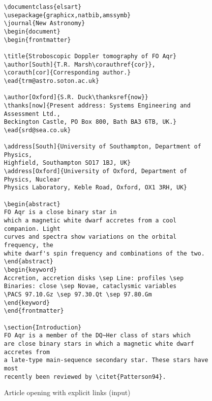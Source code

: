 \documentclass{elsart}
\begin{document}
\begin{figure}[p]

\caption{Article opening with explicit links (input)} \label{ex:explinput}
\vspace{1pc}

\begin{verbatim}
\documentclass{elsart}
\usepackage{graphicx,natbib,amssymb}
\journal{New Astronomy}
\begin{document}
\begin{frontmatter}

\title{Stroboscopic Doppler tomography of FO Aqr}
\author[South]{T.R. Marsh\corauthref{cor}},
\corauth[cor]{Corresponding author.}
\ead{trm@astro.soton.ac.uk}

\author[Oxford]{S.R. Duck\thanksref{now}}
\thanks[now]{Present address: Systems Engineering and Assessment Ltd.,
Beckington Castle, PO Box 800, Bath BA3 6TB, UK.}
\ead{srd@sea.co.uk}

\address[South]{University of Southampton, Department of Physics,
Highfield, Southampton SO17 1BJ, UK} 
\address[Oxford]{University of Oxford, Department of Physics, Nuclear
Physics Laboratory, Keble Road, Oxford, OX1 3RH, UK}
 
\begin{abstract} 
FO Aqr is a close binary star in
which a magnetic white dwarf accretes from a cool companion. Light
curves and spectra show variations on the orbital frequency, the
white dwarf's spin frequency and combinations of the two.
\end{abstract}
\begin{keyword}
Accretion, accretion disks \sep Line: profiles \sep
Binaries: close \sep Novae, cataclysmic variables 
\PACS 97.10.Gz \sep 97.30.Qt \sep 97.80.Gm 
\end{keyword}
\end{frontmatter}

\section{Introduction}
FO Aqr is a member of the DQ~Her class of stars which
are close binary stars in which a magnetic white dwarf accretes from
a late-type main-sequence secondary star. These stars have most
recently been reviewed by \citet{Patterson94}. 
\end{verbatim}

\end{figure}

\end{document}
